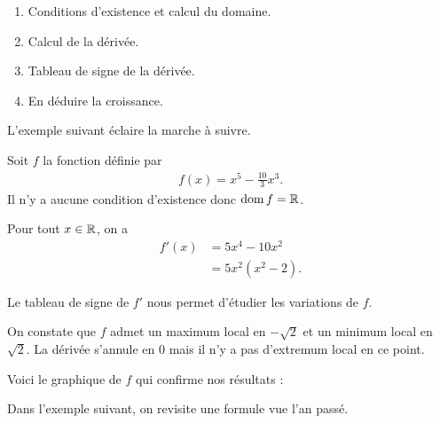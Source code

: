 \documentclass[main.tex]{subfiles}
\begin{document}
\begin{howto}

    \begin{enumerate}
        \item Conditions d'existence et calcul du domaine.
        \item Calcul de la dérivée.
        \item Tableau de signe de la dérivée.
        \item En déduire la croissance.
    \end{enumerate}
\end{howto}

L'exemple suivant éclaire la marche à suivre.

\begin{example}
     Soit $f$ la fonction définie par
     \begin{align}
         f(x) = x^5 - \frac {10} 3 x^3.
     \end{align}
     Il n'y a aucune condition d'existence donc $\operatorname{dom} f = \mathbb{R}$.

     Pour tout $x \in \mathbb{R}$, on a
     \begin{align}
         f'(x)
         &= 5 x^4 - 10 x^2\\
         &= 5 x^2 (x^2 - 2).
     \end{align}

     Le tableau de signe de $f'$ nous permet d'étudier les variations de $f$.


    On constate que $f$ admet un maximum local en $- \sqrt 2$ et un minimum local en $ \sqrt 2$.
    La dérivée s'annule en $0$ mais il n'y a pas d'extremum local en ce point.

    Voici le graphique de $f$ qui confirme nos résultats :

    \begin{plot}{0.5}{-5}{-5}{5}{5}
    \end{plot}
\end{example}

Dans l'exemple suivant, on revisite une formule vue l'an passé.
\end{document}

